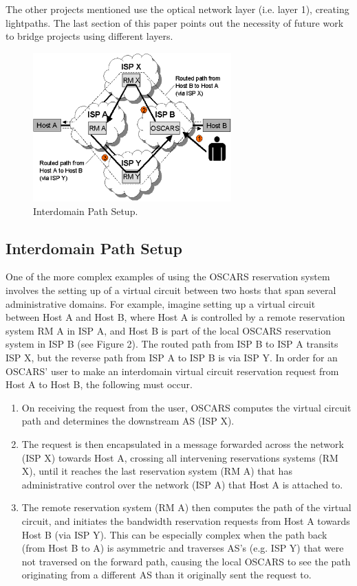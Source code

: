 \documentclass[conference]{IEEEtran}
\begin{document}
The other projects mentioned use the optical network layer (i.e. layer 1), 
creating lightpaths.  The last section of this paper points out the
necessity of future work to bridge projects using different layers.

\begin{figure}
 \centering 
   \includegraphics[width=3in]{pict2.eps}
   \caption{Interdomain Path Setup.}
 \label{fig:interdomain_path_setup}
\end{figure}

\subsection{Interdomain Path Setup }
One of the more complex examples of using the OSCARS reservation system
involves the setting up of a virtual circuit between two hosts that span
several administrative domains.  For example, imagine setting up a
virtual circuit between Host A and Host B, where Host A is controlled by a
remote reservation system RM A in ISP A, and Host B is part of the local
OSCARS reservation system in ISP B (see Figure 2). The routed path from ISP B
to ISP A transits ISP X, but the reverse path from ISP A to ISP B is via ISP Y.
In order for an OSCARS' user to make an interdomain virtual circuit reservation
request from Host A to Host B, the following must occur.
\begin{enumerate}
\item 
On receiving the request from the user, OSCARS
computes the virtual circuit path and determines the downstream AS (ISP X).
\item
The request is then encapsulated in a message forwarded across the network 
(ISP X) towards Host
A, crossing all intervening reservations systems (RM X), until it reaches the
last reservation system (RM A) that has administrative control over the network
(ISP A) that Host A is attached to.
\item
The remote reservation system (RM A) then computes the path of the virtual
circuit, and initiates the bandwidth reservation requests from Host A towards
Host B (via ISP Y).  This can be especially complex when the path back (from
Host B to A) is asymmetric and traverses AS's (e.g. ISP Y) that were not
traversed on the forward path, causing the local OSCARS to see the path
originating from a different AS than it originally sent the request to.

\end{enumerate}
\end{document}
